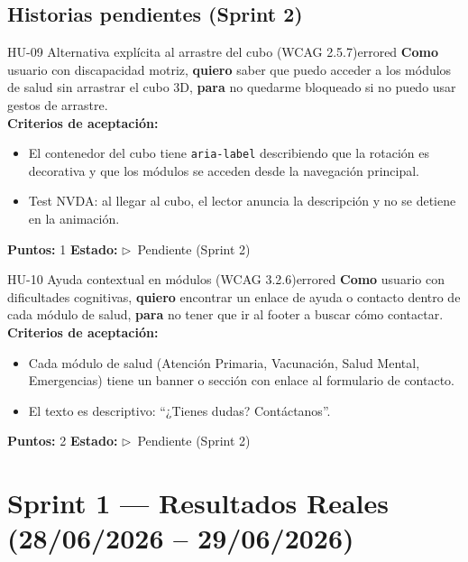\documentclass[12pt, a4paper]{article}
\newcommand{\wmark}{\textcolor{warningyellow}{$\triangleright$}}
\begin{document}
\subsection{Historias pendientes (Sprint 2)}

\begin{storybox}{HU-09 \quad Alternativa explícita al arrastre del cubo (WCAG 2.5.7)}{errored}
\textbf{Como} usuario con discapacidad motriz,
\textbf{quiero} saber que puedo acceder a los módulos de salud sin arrastrar el cubo 3D,
\textbf{para} no quedarme bloqueado si no puedo usar gestos de arrastre.\\[4pt]
\textbf{Criterios de aceptación:}
\begin{itemize}
  \item El contenedor del cubo tiene \texttt{aria-label} describiendo que la rotación es decorativa y que los módulos se acceden desde la navegación principal.
  \item Test NVDA: al llegar al cubo, el lector anuncia la descripción y no se detiene en la animación.
\end{itemize}
\textbf{Puntos:} 1 \quad \textbf{Estado:} \wmark~Pendiente (Sprint 2)
\end{storybox}

\begin{storybox}{HU-10 \quad Ayuda contextual en módulos (WCAG 3.2.6)}{errored}
\textbf{Como} usuario con dificultades cognitivas,
\textbf{quiero} encontrar un enlace de ayuda o contacto dentro de cada módulo de salud,
\textbf{para} no tener que ir al footer a buscar cómo contactar.\\[4pt]
\textbf{Criterios de aceptación:}
\begin{itemize}
  \item Cada módulo de salud (Atención Primaria, Vacunación, Salud Mental, Emergencias) tiene un banner o sección con enlace al formulario de contacto.
  \item El texto es descriptivo: ``¿Tienes dudas? Contáctanos''.
\end{itemize}
\textbf{Puntos:} 2 \quad \textbf{Estado:} \wmark~Pendiente (Sprint 2)
\end{storybox}

\section{Sprint 1 --- Resultados Reales (28/06/2026 -- 29/06/2026)}
\end{document}
